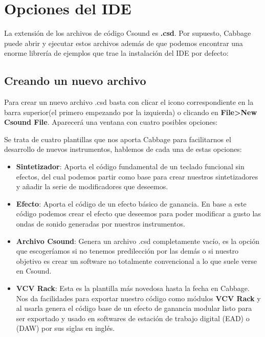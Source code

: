\section{Opciones del IDE}\label{sec:OpcionesCabbage}

La extensión de los archivos de código Csound es \textbf{.csd}. Por supuesto, Cabbage puede abrir y ejecutar estos archivos además de que podemos encontrar una enorme librería de ejemplos que trae la instalación del IDE por defecto:


\subsection{Creando un nuevo archivo}

Para crear un nuevo archivo .csd basta con clicar el icono correspondiente en la barra superior(el primero empezando por la izquierda) o clicando en \textbf{File\textgreater New Csound File}. Aparecerá una ventana con cuatro posibles opciones:


Se trata de cuatro plantillas que nos aporta Cabbage para facilitarnos el desarrollo de nuevos instrumentos, hablemos de cada una de estas opciones:

\begin{itemize}
 \item \textbf{Sintetizador}: Aporta el código fundamental de un teclado funcional sin efectos, del cual podemos partir como base para crear nuestros sintetizadores y añadir la serie de modificadores que deseemos.
 \item \textbf{Efecto}: Aporta el código de un efecto básico de ganancia. En base a este código podemos crear el efecto que deseemos para poder modificar a gusto las ondas de sonido generadas por nuestros instrumentos.
 \item \textbf{Archivo Csound}: Genera un archivo .csd completamente vacío, es la opción que escogeríamos si no tenemos predilección por las demás o si nuestro objetivo es crear un software no totalmente convencional a lo que suele verse en Csound.
 \item \textbf{VCV Rack}: Esta es la plantilla más novedosa hasta la fecha en Cabbage. Nos da facilidades para exportar nuestro código como módulos \textbf{VCV Rack} y al usarla genera el código base de un efecto de ganancia modular listo para ser exportado y usado en softwares de estación de trabajo digital (EAD) o (DAW) por sus siglas en inglés.
\end{itemize}


